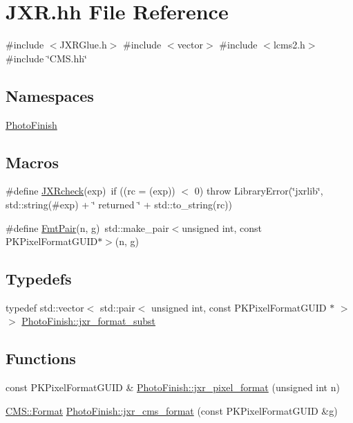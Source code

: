 \hypertarget{_j_x_r_8hh}{}\section{J\+X\+R.\+hh File Reference}
\label{_j_x_r_8hh}
{\ttfamily \#include $<$J\+X\+R\+Glue.\+h$>$}\newline
{\ttfamily \#include $<$vector$>$}\newline
{\ttfamily \#include $<$lcms2.\+h$>$}\newline
{\ttfamily \#include \char`\"{}C\+M\+S.\+hh\char`\"{}}\newline
\subsection*{Namespaces}
\begin{DoxyCompactItemize}
\item 
 \hyperlink{namespace_photo_finish}{Photo\+Finish}
\end{DoxyCompactItemize}
\subsection*{Macros}
\begin{DoxyCompactItemize}
\item 
\#define \hyperlink{_j_x_r_8hh_a405f7ccac8ce23f68c4294a39f8fe0f5}{J\+X\+Rcheck}(exp)~if ((rc = (exp)) $<$ 0) throw Library\+Error(\char`\"{}jxrlib\char`\"{}, std\+::string(\#exp) + \char`\"{} returned \char`\"{} + std\+::to\+\_\+string(rc))
\item 
\#define \hyperlink{_j_x_r_8hh_a7977c90173d0c13e4d47326e9075f79e}{Fmt\+Pair}(n,  g)~std\+::make\+\_\+pair$<$unsigned int, const P\+K\+Pixel\+Format\+G\+U\+ID$\ast$$>$(n, g)
\end{DoxyCompactItemize}
\subsection*{Typedefs}
\begin{DoxyCompactItemize}
\item 
typedef std\+::vector$<$ std\+::pair$<$ unsigned int, const P\+K\+Pixel\+Format\+G\+U\+ID $\ast$ $>$ $>$ \hyperlink{namespace_photo_finish_a230739f3d4e738115f80e9a77e225959}{Photo\+Finish\+::jxr\+\_\+format\+\_\+subst}
\end{DoxyCompactItemize}
\subsection*{Functions}
\begin{DoxyCompactItemize}
\item 
const P\+K\+Pixel\+Format\+G\+U\+ID \& \hyperlink{namespace_photo_finish_ac746e7156705edaa931c9a5bbabbc4c9}{Photo\+Finish\+::jxr\+\_\+pixel\+\_\+format} (unsigned int n)
\item 
\hyperlink{class_c_m_s_1_1_format}{C\+M\+S\+::\+Format} \hyperlink{namespace_photo_finish_ab4dd2e8b3cbf045782a20aba8c11486a}{Photo\+Finish\+::jxr\+\_\+cms\+\_\+format} (const P\+K\+Pixel\+Format\+G\+U\+ID \&g)
\end{DoxyCompactItemize}


